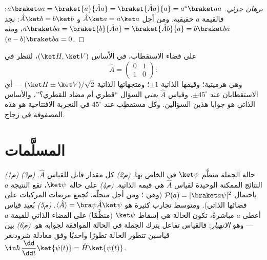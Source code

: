 \begin{proof}[برهان جزئي]
$a\braket aa = \braket{a}{\hat Aa} = \braket{\hat Aa}{a} =
a^*\braket aa$: فالقيمة $a$ حقيقية. ومن أجل $\hat A\ket a = a\ket a$ و $\hat A\ket b
= b\ket b$: نجد $a\braket ba = \braket{b}{\hat Aa} = \braket{\hat
Ab}{a} = b\braket ba$، ومنه $(a - b)\braket ba = 0$.
\end{proof}

\begin{example}\label{ex:b3:quantum-formalism:twolevel}
على فضاء الاستقطاب، في الأساس $(\ket H, \ket V)$، لننظر في
\[
\hat A = \begin{pmatrix} 0 & 1\\ 1 & 0\end{pmatrix} :
\]
وهي هرميتية؛ وقيمها الذاتية $\pm1$؛ ومتجهاتها الذاتية $(\ket H \pm
\ket V)/\sqrt2$ --- أي الاستقطابان عند $\pm45^\circ$. وقياس
$\hat A$ \emph{يعني} السؤال ``قطري أم مضاد للقطري؟''، والأساس
الذاتي هو جوابا هذين السؤالين. وكل مستقطِب عند $45^\circ$
في التجربة الافتتاحية هو هذه المصفوفة في زجاج.
\end{example}

\section{المسلَّمات}

\begin{theorem}\label{thm:b3:quantum-formalism:postulates}
\emph{(م1)} حالة الجملة  منظَّم $\ket\psi$ في
 الخاص بها.
\emph{(م2)} كل مقدار قابل للقياس 
$\hat A$.
\emph{(م3)} النتائج الممكنة الوحيدة لقياس $\hat A$ هي
قيمه الذاتية.
\emph{(م4)} على حالة $\ket\psi$، تقع النتيجة $a$ باحتمال
$\mathcal P(a) = |\braket a\psi|^2$ (وهي ؛ ومن أجل
 منحلّة، تُجمع مربعات المركبات على
فضائها الذاتي). ومتوسط تجارب كثيرة هو $\langle\hat A\rangle =
\bra\psi\hat A\ket\psi$.
\emph{(م5)} بُعيد قياس أعطى $a$ مباشرةً، تكون الحالة
هي إسقاط $\ket\psi$ (منظَّمًا) على الفضاء الذاتي للقيمة $a$
--- وهو \emph{الانهيار}: فالقياس تفاعل يترك
الجملة في الحالة الموافقة لجوابه هو.
\emph{(م6)} بين قياسين تتطور الحالة تطورًا واحديًا وفق
معادلة شرودنغر
$\iu\hbar\,\dfrac{\dd}{\dd t}\ket{\psi(t)} = \hat H\ket{\psi(t)}$.
\end{theorem}
\admitted

